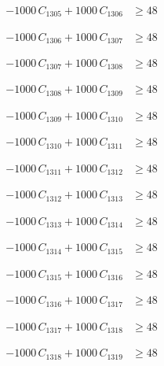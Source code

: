 \documentclass[a4paper,11pt]{article}
\begin{document}
\begin{align}
-1000\,C_{1305} + 1000\,C_{1306} &\geq 48 \nonumber
\end{align}

\begin{align}
-1000\,C_{1306} + 1000\,C_{1307} &\geq 48 \nonumber
\end{align}

\begin{align}
-1000\,C_{1307} + 1000\,C_{1308} &\geq 48 \nonumber
\end{align}

\begin{align}
-1000\,C_{1308} + 1000\,C_{1309} &\geq 48 \nonumber
\end{align}

\begin{align}
-1000\,C_{1309} + 1000\,C_{1310} &\geq 48 \nonumber
\end{align}

\begin{align}
-1000\,C_{1310} + 1000\,C_{1311} &\geq 48 \nonumber
\end{align}

\begin{align}
-1000\,C_{1311} + 1000\,C_{1312} &\geq 48 \nonumber
\end{align}

\begin{align}
-1000\,C_{1312} + 1000\,C_{1313} &\geq 48 \nonumber
\end{align}

\begin{align}
-1000\,C_{1313} + 1000\,C_{1314} &\geq 48 \nonumber
\end{align}

\begin{align}
-1000\,C_{1314} + 1000\,C_{1315} &\geq 48 \nonumber
\end{align}

\begin{align}
-1000\,C_{1315} + 1000\,C_{1316} &\geq 48 \nonumber
\end{align}

\begin{align}
-1000\,C_{1316} + 1000\,C_{1317} &\geq 48 \nonumber
\end{align}

\begin{align}
-1000\,C_{1317} + 1000\,C_{1318} &\geq 48 \nonumber
\end{align}

\begin{align}
-1000\,C_{1318} + 1000\,C_{1319} &\geq 48 \nonumber
\end{align}
\end{document}
